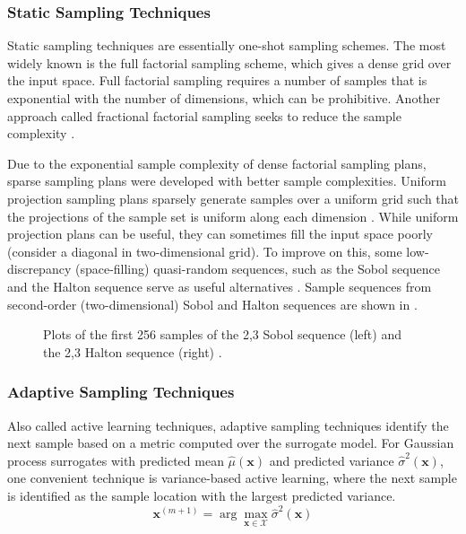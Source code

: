 \documentclass[conference]{IEEEtran}
\begin{document}
	\subsubsection{Static Sampling Techniques}
	Static sampling techniques are essentially one-shot sampling schemes. The most widely known is the full factorial sampling scheme, which gives a dense grid over the input space. Full factorial sampling requires a number of samples that is exponential with the number of dimensions, which can be prohibitive. Another approach called fractional factorial sampling seeks to reduce the sample complexity \cite{george2005statistics}. 
	
	Due to the exponential sample complexity of dense factorial sampling plans, sparse sampling plans were developed with better sample complexities. Uniform projection sampling plans sparsely generate samples over a uniform grid such that the projections of the sample set is uniform along each dimension \cite{Kochenderfer2019AlgorithmsOptimization}. While uniform projection plans can be useful, they can sometimes fill the input space poorly (consider a diagonal in two-dimensional grid). To improve on this, some low-discrepancy (space-filling) quasi-random sequences, such as the Sobol sequence and the Halton sequence serve as useful alternatives \cite{Sobol1967OnIntegrals,Halton1964AlgorithmSequence}. Sample sequences from second-order (two-dimensional) Sobol and Halton sequences are shown in .
	
	\begin{figure}[htbp]
	    \centering
	    
	    
	    \caption{Plots of the first 256 samples of the 2,3 Sobol sequence (left) and the 2,3 Halton sequence (right) \cite{SobolSequence,HaltonSequence}.}
	    \label{fig:sobol_halton}
	\end{figure}
	
    \subsubsection{Adaptive Sampling Techniques}	
    Also called active learning techniques, adaptive sampling techniques identify the next sample based on a metric computed over the surrogate model. For Gaussian process surrogates with predicted mean $\hat{\mu}(\boldsymbol{x})$ and predicted variance $\hat{\sigma}^2({\boldsymbol{x}})$, one convenient technique is variance-based active learning, where the next sample is identified as the sample location with the largest predicted variance.
    \begin{equation}
        \boldsymbol{x}^{(m+1)} = \arg\max_{\boldsymbol{x}\in\mathcal{X}} \hat{\sigma}^2(\boldsymbol{x})
    \end{equation}
    
\end{document}
